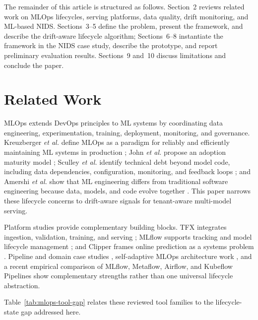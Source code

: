 \documentclass[runningheads]{llncs}
\begin{document}
The remainder of this article is structured as follows. Section~2 reviews related work on MLOps lifecycles, serving platforms, data quality, drift monitoring, and ML-based NIDS. Sections~3--5 define the problem, present the framework, and describe the drift-aware lifecycle algorithm; Sections~6--8 instantiate the framework in the NIDS case study, describe the prototype, and report preliminary evaluation results. Sections~9 and~10 discuss limitations and conclude the paper.

\section{Related Work}

MLOps extends DevOps principles to ML systems by coordinating data engineering, experimentation, training, deployment, monitoring, and governance. Kreuzberger \textit{et al.} define MLOps as a paradigm for reliably and efficiently maintaining ML systems in production \cite{kreuzberger2023mlops}; John \textit{et al.} propose an adoption maturity model \cite{john2021towards}; Sculley \textit{et al.} identify technical debt beyond model code, including data dependencies, configuration, monitoring, and feedback loops \cite{sculley2015debt}; and Amershi \textit{et al.} show that ML engineering differs from traditional software engineering because data, models, and code evolve together \cite{amershi2019software}. This paper narrows these lifecycle concerns to drift-aware signals for tenant-aware multi-model serving.

Platform studies provide complementary building blocks. TFX integrates ingestion, validation, training, and serving \cite{baylor2017tfx}; MLflow supports tracking and model lifecycle management \cite{mlflow}; and Clipper frames online prediction as a systems problem \cite{crankshaw2017clipper}. Pipeline and domain case studies \cite{zhou2020pipeline,subramanya2022devops}, self-adaptive MLOps architecture work \cite{Bhatt2025HarmonE}, and a recent empirical comparison of MLflow, Metaflow, Airflow, and Kubeflow Pipelines \cite{MarcosMercade2026MLOpsFrameworks} show complementary strengths rather than one universal lifecycle abstraction.

Table~\ref{tab:mlops-tool-gap} relates these reviewed tool families to the lifecycle-state gap addressed here.
\end{document}
